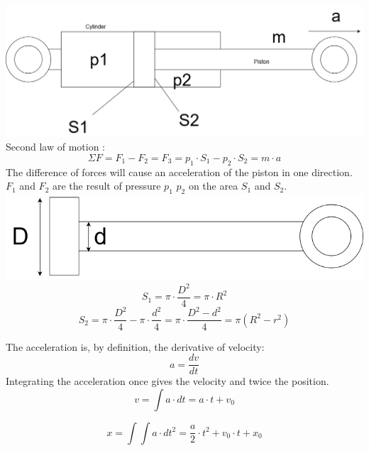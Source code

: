 \documentclass[12pt,a4paper]{article}
\begin{document}
	\includegraphics[scale=.35]{Hydraulic_cylinder.png}
	\\
	Second law of motion : 
	\begin{equation}
		\Sigma F = F_1 - F_2 = F_3 = p_1 \cdot S_1 - p_2 \cdot S_2= m \cdot a
	\end{equation}
	The difference of forces will cause an acceleration of the piston in one direction.
	$F_1$ and $F_2$ are the result of pressure $p_1$ $p_2$ on the area $S_1$ and $S_2$. \\
	
	\includegraphics[scale=.35]{Hydraulic_cylinder_piston.png}
	\begin{equation}
		S_1 = \pi \cdot \frac{D^2}{4} = \pi \cdot R^2 
	\end{equation}
	\begin{equation}
		S_2 = \pi \cdot \frac{D^2}{4} - \pi \cdot \frac{d^2}{4} = \pi \cdot \frac{D^2-d^2}{4} = \pi (R^2-r^2)
	\end{equation}
	
	
	
	The acceleration is, by definition, the derivative of velocity:
	\begin{equation}
		a = \frac{dv}{dt}
	\end{equation}
	Integrating the acceleration once gives the velocity and twice the position. 
	\begin{equation}
		v = \int a \cdot dt = a \cdot t + v_0
	\end{equation}
	
	\begin{equation}
		x = \int \int a \cdot dt^2 = \frac{a}{2} \cdot t^2 + v_0 \cdot t + x_0
	\end{equation}
	
\end{document}
